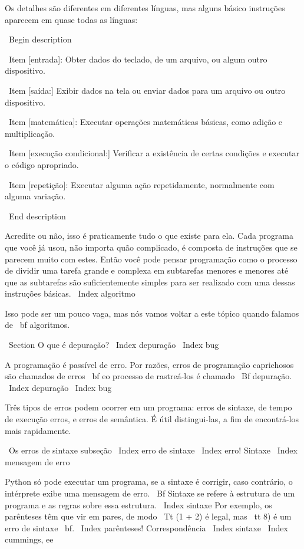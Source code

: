 \documentclass[10pt]{book}
\begin{document}
{Os detalhes são diferentes em diferentes línguas, mas alguns básico
instruções aparecem em quase todas as línguas:

\ Begin {description}

\ Item [entrada]: Obter dados do teclado, de um arquivo, ou algum
outro dispositivo.

\ Item [saída:] Exibir dados na tela ou enviar dados para um
arquivo ou outro dispositivo.

\ Item [matemática]: Executar operações matemáticas básicas, como adição e
multiplicação.

\ Item [execução condicional:] Verificar a existência de certas condições e
executar o código apropriado.

\ Item [repetição]: Executar alguma ação repetidamente, normalmente com
alguma variação.

\ End {description}

Acredite ou não, isso é praticamente tudo o que existe para ela. Cada
programa que você já usou, não importa quão complicado, é composta de
instruções que se parecem muito com estes. Então você pode pensar
programação como o processo de dividir uma tarefa grande e complexa
em subtarefas menores e menores até que as subtarefas são
suficientemente simples para ser realizado com uma dessas instruções básicas.
\ Index {algoritmo}

Isso pode ser um pouco vaga, mas nós vamos voltar a este tópico
quando falamos de {\ bf algoritmos}.

\ Section {O que é depuração?}
\ Index {depuração}
\ Index {bug}

A programação é passível de erro. Por razões, erros de programação caprichosos
são chamados de erros {\ bf} eo processo de rastreá-los é chamado
{\ Bf depuração}.
\ Index {depuração}
\ Index {bug}

Três tipos de erros podem ocorrer em um programa: erros de sintaxe, de tempo de execução 
erros, e erros de semântica. É útil
distingui-las, a fim de encontrá-los mais rapidamente.

\ {Os erros de sintaxe} subseção
\ Index {erro de sintaxe}
\ Index {erro! Sintaxe}
\ Index {mensagem de erro}

Python só pode executar um programa, se a sintaxe é
corrigir, caso contrário, o intérprete exibe uma mensagem de erro.
{\ Bf} Sintaxe se refere à estrutura de um programa e as regras sobre
essa estrutura. \ Index {} sintaxe
Por exemplo, os parênteses têm que vir em pares, de modo
{\ Tt (1 + 2)} é legal, mas {\ tt 8)} é um erro de sintaxe {\ bf}.
\ Index {parênteses! Correspondência}
\ Index {} sintaxe
\ Index {cummings, ee}

}
\end{document}

